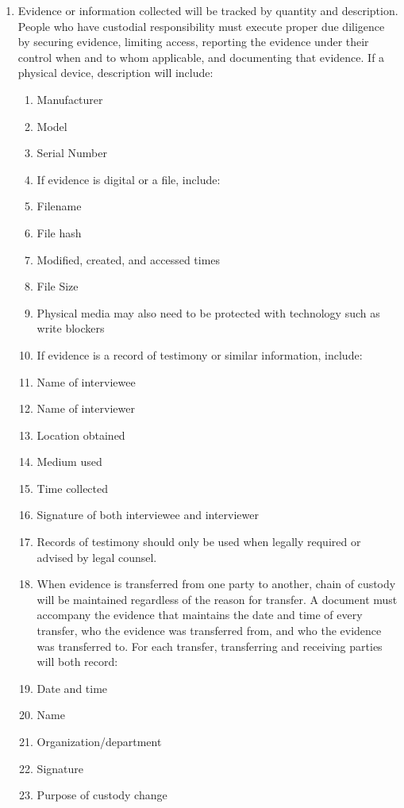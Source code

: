 \documentclass[../main.tex]{subfiles}
\begin{document}
\begin{enumerate}
    \item Evidence or information collected will be tracked by quantity and description. People who have custodial responsibility must execute proper due
    diligence by securing evidence, limiting access, reporting the evidence under their control when and to whom applicable, and documenting that evidence.
    If a physical device, description will include:
    \begin{enumerate}
        \item Manufacturer
        \item Model
        \item Serial Number
        \item If evidence is digital or a file, include:
        \item Filename
        \item File hash
        \item Modified, created, and accessed times
        \item File Size
        \item Physical media may also need to be protected with technology such as write blockers
        \item If evidence is a record of testimony or similar information, include:
        \item Name of interviewee
        \item Name of interviewer
        \item Location obtained
        \item Medium used
        \item Time collected
        \item Signature of both interviewee and interviewer
        \item Records of testimony should only be used when legally required or advised by legal counsel.
        \item When evidence is transferred from one party to another, chain of custody will be maintained regardless of the reason for transfer.
        A document must accompany the evidence that maintains the date and time of every transfer, who the evidence was transferred from,
        and who the evidence was transferred to. For each transfer, transferring and receiving parties will both record:
        \item Date and time
        \item Name
        \item Organization/department
        \item Signature
        \item Purpose of custody change
    \end{enumerate}
\end{enumerate}
\end{document}
